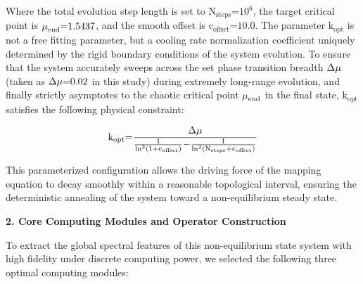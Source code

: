 \documentclass[fractalfract,article,submit,oneauthor,pdftex]{Definitions/mdpi}
\begin{document}
Where the total evolution step length is set to
\(\text{N}_{\text{steps}}\text{=}\text{10}^{\text{6}}\), the target
critical point is \(\text{\ensuremath{\mu}}_{\text{end}}\text{=1.5437}\), and the
smooth offset is \(\text{c}_{\text{offset}}\text{=10.0}\). The parameter
\(\text{k}_{\text{opt}}\) is not a free fitting parameter, but a cooling
rate normalization coefficient uniquely determined by the rigid boundary
conditions of the system evolution. To ensure that the system accurately
sweeps across the set phase transition breadth \(\text{\ensuremath{\Delta}}\text{\ensuremath{\mu}}\)
(taken as \(\text{\ensuremath{\Delta}}\text{\ensuremath{\mu}}\text{=0.02}\) in this study) during
extremely long-range evolution, and finally strictly asymptotes to the
chaotic critical point \(\text{\ensuremath{\mu}}_{\text{end}}\) in the final state,
\(\text{k}_{\text{opt}}\) satisfies the following physical constraint:

\begin{equation}
\text{k}_{\text{opt}}\text{=}\frac{\text{\ensuremath{\Delta}}\text{\ensuremath{\mu}}}{\frac{\text{1}}{\text{ln}^{\text{2}}\text{(1+}\text{c}_{\text{offset}}\text{)}}\text{\ensuremath{-}}\frac{\text{1}}{\text{ln}^{\text{2}}\text{(}\text{N}_{\text{steps}}\text{+}\text{c}_{\text{offset}}\text{)}}}
\end{equation}

This parameterized configuration allows the driving force of the mapping
equation to decay smoothly within a reasonable topological interval,
ensuring the deterministic annealing of the system toward a
non-equilibrium steady state.

\textbf{2. Core Computing Modules and Operator Construction}

To extract the global spectral features of this non-equilibrium state
system with high fidelity under discrete computing power, we selected
the following three optimal computing modules:
\end{document}
